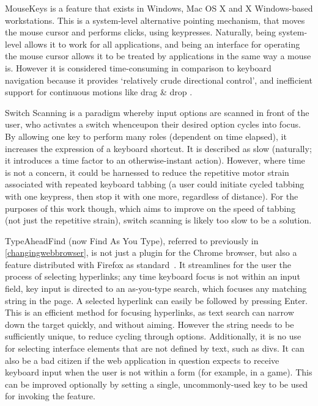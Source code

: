 \documentclass[a4paper, 12pt]{report}
\begin{document}
MouseKeys is a feature that exists in Windows, Mac OS X and X Windows-based workstations. This is a system-level alternative pointing mechanism, that moves the mouse cursor and performs clicks, using keypresses. Naturally, being system-level allows it to work for all applications, and being an interface for operating the mouse cursor allows it to be treated by applications in the same way a mouse is. However it is considered time-consuming in comparison to keyboard navigation because it provides `relatively crude directional control', and inefficient support for continuous motions like drag \& drop \cite{bergman1995towards}.

Switch Scanning is a paradigm whereby input options are scanned in front of the user, who activates a switch whenceupon their desired option cycles into focus\cite{hendrix1997adapting}. By allowing one key to perform many roles (dependent on time elapsed), it increases the expression of a keyboard shortcut. It is described as slow (naturally; it introduces a time factor to an otherwise-instant action). However, where time is not a concern, it could be harnessed to reduce the repetitive motor strain associated with repeated keyboard tabbing (a user could initiate cycled tabbing with one keypress, then stop it with one more, regardless of distance). For the purposes of this work though, which aims to improve on the speed of tabbing (not just the repetitive strain), switch scanning is likely too slow to be a solution.

TypeAheadFind (now Find As You Type), referred to previously in \cref{changingwebbrowser}, is not just a plugin for the Chrome browser, but also a feature distributed with Firefox as standard~\cite{firefoxshortcuts}. It streamlines for the user the process of selecting hyperlinks; any time keyboard focus is not within an input field, key input is directed to an as-you-type search, which focuses any matching string in the page. A selected hyperlink can easily be followed by pressing Enter. This is an efficient method for focusing hyperlinks, as text search can narrow down the target quickly, and without aiming. However the string needs to be sufficiently unique, to reduce cycling through options. Additionally, it is no use for selecting interface elements that are not defined by text, such as divs. It can also be a bad citizen if the web application in question expects to receive keyboard input when the user is not within a form (for example, in a game). This can be improved optionally by setting a single, uncommonly-used key to be used for invoking the feature.
\end{document}
